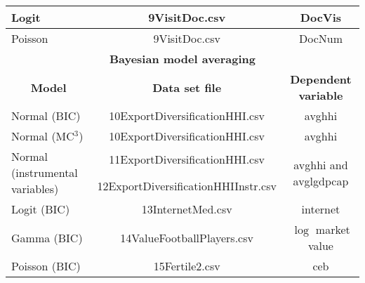\begin{table}[!ht]
\begin{center}
{{\begin{tabular}{|l|c|c|}
	\hline
	Logit & 9VisitDoc.csv  & DocVis \\
	\hline
	Poisson & 9VisitDoc.csv  & DocNum \\
	\hline
	\multicolumn{3}{|c|}{\textbf{Bayesian model averaging}} \\
	\hline  
	\multicolumn{1}{|c|}{\textbf{Model}} & \multicolumn{1}{c}{\textbf{Data set file}} & \multicolumn{1}{|c|}{\textbf{Dependent variable}} \\ 
	\hline
	Normal (BIC) & 10ExportDiversificationHHI.csv & avghhi \\
	Normal (MC$^3$) & 10ExportDiversificationHHI.csv & avghhi \\
	\multirow{2}{*}{Normal (instrumental variables)} & 11ExportDiversificationHHI.csv & \multirow{2}{*}{avghhi and avglgdpcap}\\
	& 12ExportDiversificationHHIInstr.csv & \\
	Logit (BIC) & 13InternetMed.csv & internet \\
	Gamma (BIC) & 14ValueFootballPlayers.csv & $\log$ market value\\
	Poisson (BIC) & 15Fertile2.csv & ceb \\
	\hline
	\end{tabular}
}}
\end{center}
\end{table}